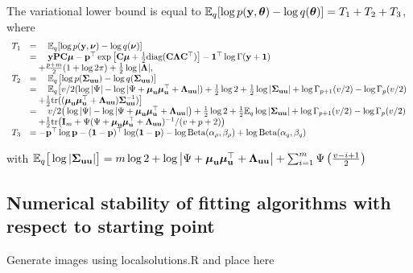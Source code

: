 \documentclass{amsart}[12pt]
\newcommand{\mgc}[1]{{\color{blue}#1}}
\begin{document}
	The variational lower bound is equal to ${\mathbb E}_q[\log{p({\bf y}, {\boldsymbol\theta})} - \log{q({\boldsymbol\theta})}] = T_1 + T_2 + T_3$,
	where
	$$
	\begin{array}{rl}
		T_1 & = \quad {\mathbb E}_q[\log{p({\bf y}, {\boldsymbol\nu})} - \log{q({\boldsymbol\nu})}]                                                                                                                                                  \\
		    & = \quad {\bf y} {\bf P} {\bf C} {\boldsymbol\mu} - {\bf p}^\top \exp{\left[ {\bf C}{\boldsymbol\mu}+  \tfrac{1}{2} \text{diag} ({\bf C}{\boldsymbol\Lambda}{\bf C}^\top) \right]} - {\bf 1}^\top\log \Gamma{({\bf y}+ {\bf1})}                                               \\
		    & \quad + \frac{p + m}{2} (1 + \log{2 \pi}) + \tfrac{1}{2} \log{|{\boldsymbol\Lambda}|},                                                                                                                                \\
		T_2 & = \quad {\mathbb E}_q \left[ \log p({\boldsymbol \Sigma}_{{\bf u} {\bf u}}) - \log q({\boldsymbol \Sigma}_{{\bf u} {\bf u}}) \right]                                                                                                                 \\
		    & = \quad {\mathbb E}_q \big[ v/2(\log |\Psi| - \log |\Psi + {\boldsymbol \mu}_{\bf u} {\boldsymbol \mu}_{\bf u}^\top + {\boldsymbol \Lambda}_{{\bf u} {\bf u}}|) + \tfrac{1}{2} \log 2 + \tfrac{1}{2} \log|{\boldsymbol \Sigma}_{{\bf u} {\bf u}}| + \log \Gamma_{p+1}(v/2) - \log \Gamma_{p}(v/2)    \\
		    & \quad + \tfrac{1}{2} \text{tr}(({\boldsymbol \mu}_{{\bf u}} {\boldsymbol \mu}_{{\bf u}}^\top + {\boldsymbol \Lambda}_{{\bf u} {\bf u}}) {\boldsymbol \Sigma}_{{\bf u} {\bf u}}^{-1}) \big]                                                                                                  \\
		    & = \quad v/2\big(\log |\Psi| - \log |\Psi + {\boldsymbol \mu}_{\bf u} {\boldsymbol \mu}_{\bf u}^\top + {\boldsymbol \Lambda}_{{\bf u} {\bf u}}|\big) + \tfrac{1}{2} \log 2 + \tfrac{1}{2} {\mathbb E}_q \log |{\boldsymbol \Sigma}_{{\bf u} {\bf u}}| + \log \Gamma_{p+1}(v/2) - \log \Gamma_{p}(v/2) \\
		    & \quad + \tfrac{1}{2} \text{tr}\big({\bf I}_m + \Psi(\Psi+ {\boldsymbol \mu}_{\bf u} {\boldsymbol \mu}_{\bf u}^\top + {\boldsymbol \Lambda}_{{\bf u} {\bf u}})^{-1}/(v + p + 2)\big)                                                                                        \\
		T_3 & = - {\bf p}^\top \log {\bf p} - ({\bf 1} - {\bf p})^\top \log ({\bf 1} - {\bf p}) - \log \text{Beta} (\alpha_\rho, \beta_\rho) + \log \text{Beta} (\alpha_q, \beta_q)                                                              
	\end{array}
	$$
		
	\noindent with ${\mathbb E}_q \big[ \log |{\boldsymbol \Sigma}_{{\bf u} {\bf u}}| \big] = m \log 2 + \log \left | \Psi + {\boldsymbol \mu}_{\bf u} {\boldsymbol \mu}_{\bf u}^\top + {\boldsymbol \Lambda}_{{\bf u} {\bf u}} \right | + \sum_{i=1}^m \Psi \left ( \frac{v - i + 1}{2} \right )$
		
	\subsection{Numerical stability of fitting algorithms with respect to starting point}
		
	\mgc{Generate images using local\textunderscore solutions.R and place here}
		
	
	
			
\end{document}
